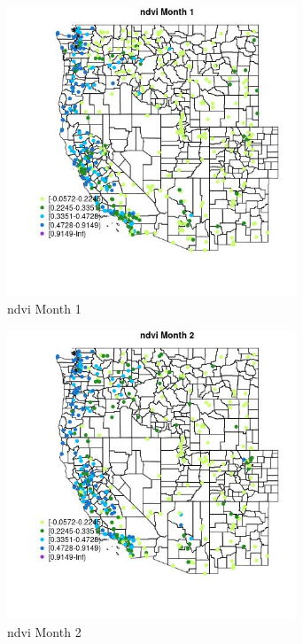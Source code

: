 \begin{figure} 
\centering  
\includegraphics[width=0.77\textwidth]{Code_Outputs/Report_ML_input_PM25_Step4_part_e_de_duplicated_aves_compiled_2019-05-18wNAs_MapObsMo1ndvi.jpg} 
\caption{\label{fig:Report_ML_input_PM25_Step4_part_e_de_duplicated_aves_compiled_2019-05-18wNAsMapObsMo1ndvi}ndvi Month 1} 
\end{figure} 
 

\begin{figure} 
\centering  
\includegraphics[width=0.77\textwidth]{Code_Outputs/Report_ML_input_PM25_Step4_part_e_de_duplicated_aves_compiled_2019-05-18wNAs_MapObsMo2ndvi.jpg} 
\caption{\label{fig:Report_ML_input_PM25_Step4_part_e_de_duplicated_aves_compiled_2019-05-18wNAsMapObsMo2ndvi}ndvi Month 2} 
\end{figure} 
 

